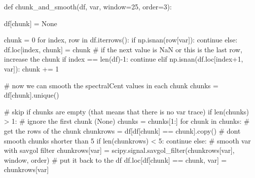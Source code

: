 \documentclass[
  letterpaper,
  DIV=11,
  numbers=noendperiod]{scrreprt}
\newenvironment{Shaded}{\begin{snugshade}}{\end{snugshade}}
\newcommand{\BuiltInTok}[1]{\textcolor[rgb]{0.00,0.23,0.31}{#1}}
\newcommand{\CommentTok}[1]{\textcolor[rgb]{0.37,0.37,0.37}{#1}}
\newcommand{\ControlFlowTok}[1]{\textcolor[rgb]{0.00,0.23,0.31}{#1}}
\newcommand{\DecValTok}[1]{\textcolor[rgb]{0.68,0.00,0.00}{#1}}
\newcommand{\KeywordTok}[1]{\textcolor[rgb]{0.00,0.23,0.31}{#1}}
\newcommand{\NormalTok}[1]{\textcolor[rgb]{0.00,0.23,0.31}{#1}}
\newcommand{\OperatorTok}[1]{\textcolor[rgb]{0.37,0.37,0.37}{#1}}
\newcommand{\StringTok}[1]{\textcolor[rgb]{0.13,0.47,0.30}{#1}}
\newcommand{\VariableTok}[1]{\textcolor[rgb]{0.07,0.07,0.07}{#1}}
\begin{document}
\begin{Shaded}
\begin{Highlighting}[]
\KeywordTok{def}\NormalTok{ chunk\_and\_smooth(df, var, window}\OperatorTok{=}\DecValTok{25}\NormalTok{, order}\OperatorTok{=}\DecValTok{3}\NormalTok{):}

\NormalTok{    df[}\StringTok{\textquotesingle{}chunk\textquotesingle{}}\NormalTok{] }\OperatorTok{=} \VariableTok{None}

\NormalTok{    chunk }\OperatorTok{=} \DecValTok{0}
    \ControlFlowTok{for}\NormalTok{ index, row }\KeywordTok{in}\NormalTok{ df.iterrows():}
        \ControlFlowTok{if}\NormalTok{ np.isnan(row[var]):}
            \ControlFlowTok{continue}
        \ControlFlowTok{else}\NormalTok{:}
\NormalTok{            df.loc[index, }\StringTok{\textquotesingle{}chunk\textquotesingle{}}\NormalTok{] }\OperatorTok{=}\NormalTok{ chunk}
            \CommentTok{\# if the next value is NaN or this is the last row, increase the chunk}
            \ControlFlowTok{if}\NormalTok{ index }\OperatorTok{==} \BuiltInTok{len}\NormalTok{(df)}\OperatorTok{{-}}\DecValTok{1}\NormalTok{:}
                \ControlFlowTok{continue}
            \ControlFlowTok{elif}\NormalTok{ np.isnan(df.loc[index}\OperatorTok{+}\DecValTok{1}\NormalTok{, var]):}
\NormalTok{                chunk }\OperatorTok{+=} \DecValTok{1}

    \CommentTok{\# now we can smooth the spectralCent values in each chunk}
\NormalTok{    chunks }\OperatorTok{=}\NormalTok{ df[}\StringTok{\textquotesingle{}chunk\textquotesingle{}}\NormalTok{].unique()}

    \CommentTok{\# skip if chunks are empty (that means that there is no var trace)}
    \ControlFlowTok{if} \BuiltInTok{len}\NormalTok{(chunks) }\OperatorTok{\textgreater{}} \DecValTok{1}\NormalTok{:}
        \CommentTok{\# ignore the first chunk (None)}
\NormalTok{        chunks }\OperatorTok{=}\NormalTok{ chunks[}\DecValTok{1}\NormalTok{:]}
        \ControlFlowTok{for}\NormalTok{ chunk }\KeywordTok{in}\NormalTok{ chunks:}
            \CommentTok{\# get the rows of the chunk}
\NormalTok{            chunkrows }\OperatorTok{=}\NormalTok{ df[df[}\StringTok{\textquotesingle{}chunk\textquotesingle{}}\NormalTok{] }\OperatorTok{==}\NormalTok{ chunk].copy()}
            \CommentTok{\# dont smooth chunks shorter than 5}
            \ControlFlowTok{if} \BuiltInTok{len}\NormalTok{(chunkrows) }\OperatorTok{\textless{}} \DecValTok{5}\NormalTok{:}
                \ControlFlowTok{continue}
            \ControlFlowTok{else}\NormalTok{:}
                \CommentTok{\# smooth var with savgol filter}
\NormalTok{                chunkrows[var] }\OperatorTok{=}\NormalTok{ scipy.signal.savgol\_filter(chunkrows[var], window, order) }
                \CommentTok{\# put it back to the df}
\NormalTok{                df.loc[df[}\StringTok{\textquotesingle{}chunk\textquotesingle{}}\NormalTok{] }\OperatorTok{==}\NormalTok{ chunk, var] }\OperatorTok{=}\NormalTok{ chunkrows[var]}


\end{Highlighting}
\end{Shaded}
\end{document}
